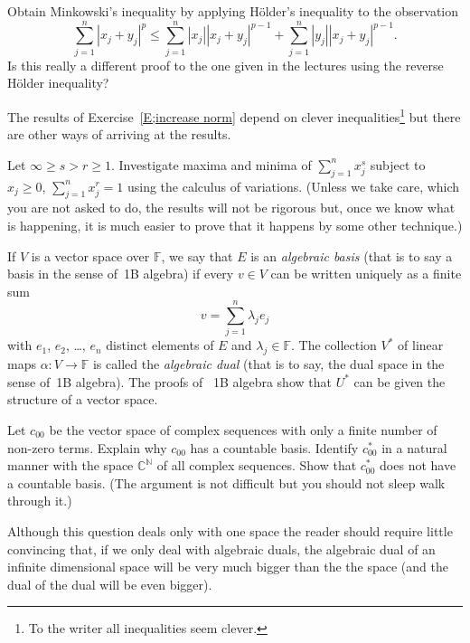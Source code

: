 \begin{exercise}\label{C5.2} Obtain Minkowski's inequality
by applying H{\"o}lder's inequality to the observation
\[\sum_{j=1}^{n}|x_{j}+y_{j}|^{p}
\leq \sum_{j=1}^{n}|x_{j}||x_{j}+y_{j}|^{p-1}
+\sum_{j=1}^{n}|y_{j}||x_{j}+y_{j}|^{p-1}.\]
Is this really a different proof to the one given
in the lectures using the reverse H{\"o}lder inequality?
\end{exercise}
\begin{exercise}\label{C5.3} The results of Exercise~\ref{E;increase norm}
depend on clever inequalities\footnote{To the writer
all inequalities seem clever.} but there are other
ways of arriving at the results.

Let $\infty\geq s>r\geq 1$.
Investigate maxima and minima of $\sum_{j=1}^{n}x_{j}^{s}$
subject to $x_{j}\geq 0$,
$\sum_{j=1}^{n}x_{j}^{r}=1$ using the calculus of variations.
(Unless we take care, which you are not asked to do,
the results will not be rigorous
but, once we know what is happening, it is much easier
to prove that it happens by some other technique.)
\end{exercise}
\begin{exercise}\label{C5.4} 
If $V$ is a vector space over ${\mathbb F}$,
we say that $E$ is an \emph{algebraic basis}
(that is to say a basis in the sense of~1B algebra)
if every $v\in V$ can be written uniquely as a finite sum
\[v=\sum_{j=1}^{n}\lambda_{j}e_{j}\]
with $e_{1}$, $e_{2}$, \dots, $e_{n}$ distinct
elements of $E$ and $\lambda_{j}\in{\mathbb F}$.
The collection $V^{*}$ of linear maps $\alpha:V\rightarrow{\mathbb F}$
is called the \emph{algebraic dual} 
(that is to say, the dual space in the sense of~1B algebra).
The proofs of ~1B algebra show that $U^{*}$ can be given the
structure of a vector space.

Let $c_{00}$ be the vector space
of complex sequences with only a finite number of 
non-zero terms. Explain why $c_{00}$ has a countable basis.
Identify $c_{00}^{*}$ in a natural manner with the
space ${\mathbb C}^{\mathbb N}$ of all 
complex sequences. Show that $c_{00}^{*}$
does not have a countable basis. (The argument
is not difficult but you should not sleep walk
through it.)

Although this question deals only with one space the
reader should require little convincing that, if we
only deal with algebraic duals, the algebraic dual of
an infinite dimensional space will be very much bigger
than the the space (and the dual of the dual will be even bigger).
\end{exercise}  
